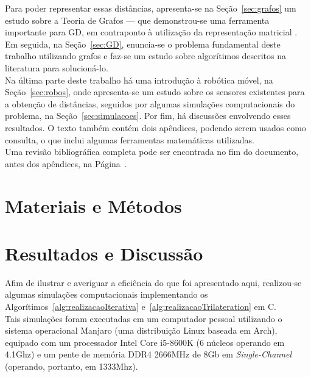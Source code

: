 \documentclass[a4paper,12pt]{report}
\begin{document}
	Para poder representar essas distâncias, apresenta-se na Seção~\ref{sec:grafos} um estudo sobre a Teoria de Grafos --- que demonstrou-se uma ferramenta importante para GD, em contraponto à utilização da representação matricial \cite{carlileGDandAplications}. Em seguida, na Seção~\ref{sec:GD}, enuncia-se o problema fundamental deste trabalho utilizando grafos e faz-se um estudo sobre algorítimos descritos na literatura para solucioná-lo.
	\\
	
	Na última parte deste trabalho há uma introdução à robótica móvel, na Seção~\ref{sec:robos}, onde apresenta-se um estudo sobre os sensores existentes para a obtenção de distâncias, seguidos por algumas simulações computacionais do problema, na Seção~\ref{sec:simulacoes}. Por fim, há discussões envolvendo esses resultados. O texto também contém dois apêndices, podendo serem usados como consulta, o que inclui algumas ferramentas matemáticas utilizadas. 
	\\
	
	Uma revisão bibliográfica completa pode ser encontrada no fim do documento, antes dos apêndices, na Página~\pageref{sec:ref}.
	
	\newpage
	
	\chapter{Materiais e Métodos}
	
	
	
	\newpage
	
	

	\newpage
	\chapter{Resultados e Discussão \label{sec:disc}}
	
	
	
	Afim de ilustrar e averiguar a eficiência do que foi apresentado aqui, realizou-se algumas simulações computacionais implementando os Algorítimos~\ref{alg:realizacaoIterativa} e~\ref{alg:realizacaoTrilateration} em C. 
	\\
	
	Tais simulações foram executadas em um computador pessoal utilizando o sistema operacional Manjaro (uma distribuição Linux baseada em Arch), equipado com um processador Intel Core i5-8600K (6 núcleos operando em 4.1Ghz) e um pente de memória DDR4 2666MHz de 8Gb em \textit{Single-Channel} (operando, portanto, em 1333Mhz).	
	\\
	
\end{document}
